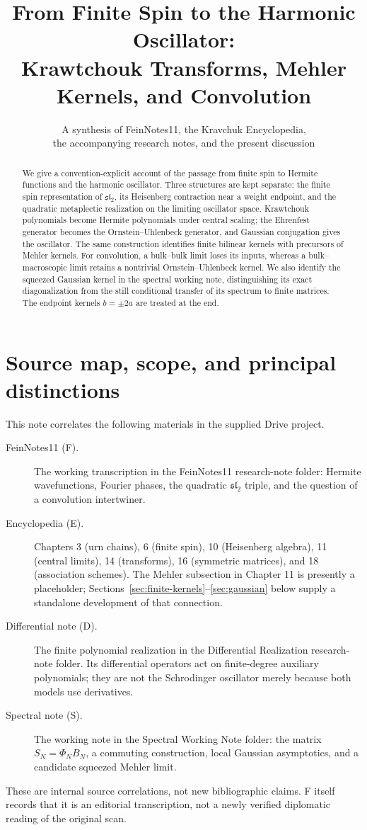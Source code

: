 \documentclass[11pt,reqno]{amsart}
\title[Finite Spin, Krawtchouk Systems, and Oscillators]{From Finite Spin to the Harmonic Oscillator:\\Krawtchouk Transforms, Mehler Kernels, and Convolution}
\date{A synthesis of FeinNotes11, the Kravchuk Encyclopedia,\\the accompanying research notes, and the present discussion}
\theoremstyle{remark}\newtheorem{remark}[proposition]{Remark}
\begin{document}
\begin{abstract}
We give a convention-explicit account of the passage from finite spin to
Hermite functions and the harmonic oscillator. Three structures are kept
separate: the finite spin representation of $\mathfrak{sl}_2$, its
Heisenberg contraction near a weight endpoint, and the quadratic
metaplectic realization on the limiting oscillator space. Krawtchouk
polynomials become Hermite polynomials under central scaling; the
Ehrenfest generator becomes the Ornstein--Uhlenbeck generator, and
Gaussian conjugation gives the oscillator. The same construction
identifies finite bilinear kernels with precursors of Mehler kernels.
For convolution, a bulk--bulk limit loses its inputs, whereas a
bulk--macroscopic limit retains a nontrivial Ornstein--Uhlenbeck kernel.
We also identify the squeezed Gaussian kernel in the spectral working
note, distinguishing its exact diagonalization from the still conditional
transfer of its spectrum to finite matrices. The endpoint kernels
$b=\pm2a$ are treated at the end.
\end{abstract}
\maketitle
\tableofcontents

\section{Source map, scope, and principal distinctions}
This note correlates the following materials in the supplied Drive project.
\begin{description}
\item[FeinNotes11 (F).] The working transcription in
the FeinNotes11 research-note folder: Hermite wavefunctions,
Fourier phases, the quadratic $\mathfrak{sl}_2$ triple, and the question
of a convolution intertwiner.
\item[Encyclopedia (E).] Chapters 3 (urn chains), 6 (finite spin), 10
(Heisenberg algebra), 11 (central limits), 14 (transforms), 16 (symmetric
matrices), and 18 (association schemes). The Mehler subsection in
Chapter 11 is presently a placeholder; Sections~\ref{sec:finite-kernels}--\ref{sec:gaussian}
below supply a standalone development of that connection.
\item[Differential note (D).] The finite polynomial realization in
the Differential Realization research-note folder. Its differential
operators act on finite-degree auxiliary polynomials; they are not the
Schrodinger oscillator merely because both models use derivatives.
\item[Spectral note (S).] The working note in
the Spectral Working Note folder: the matrix $S_N=\Phi_NB_N$,
a commuting construction, local Gaussian asymptotics, and a candidate
squeezed Mehler limit.
\end{description}
These are internal source correlations, not new bibliographic claims.
F itself records that it is an editorial transcription, not a newly
verified diplomatic reading of the original scan.
\end{document}
